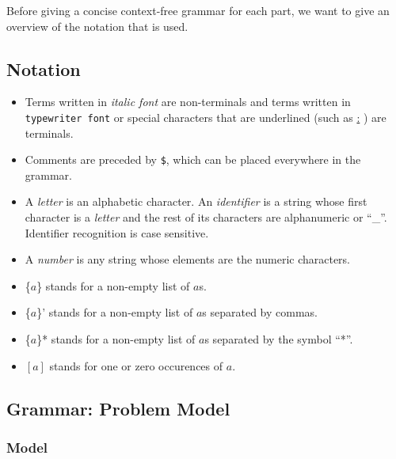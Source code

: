 \documentclass{article}
\begin{document}
Before giving a concise context-free grammar for each part, we want to
give an overview of the notation that is used.  


\subsection{Notation}

\begin{itemize}
  \item Terms written in {\it italic font} are non-terminals and terms
  written in {\tt typewriter font} or special characters that 
  are underlined (such as \underline{:} ) are terminals.
  \item Comments are preceded by {\tt \$}, which can be placed everywhere in
the grammar. 
  \item A \textit{letter} is an alphabetic character. An \textit{identifier} is 
    a string whose first character is a \textit{letter} and the rest of its characters 
    are alphanumeric or ``\_''.  Identifier recognition is case sensitive. 

  \item A \textit{number} is any string whose elements are the numeric  characters.
  \item \{$a$\} stands for a non-empty list of $a$s.
  \item \{$a$\}' stands for a non-empty list of $a$s separated by commas.
  \item \{$a$\}* stands for a non-empty list of $a$s separated by the symbol ``*''.
  \item $[a]$ stands for one or zero occurences of $a$.

\end{itemize}



\subsection{Grammar: Problem Model}

\subsubsection{Model}
\end{document}
